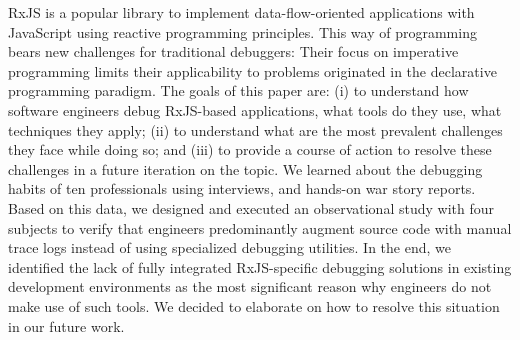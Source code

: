 RxJS is a popular library to implement data-flow-oriented applications with JavaScript using reactive programming principles. This way of programming bears new challenges for traditional debuggers: Their focus on imperative programming limits their applicability to problems originated in the declarative programming paradigm. The goals of this paper are: (i) to understand how software engineers debug RxJS-based applications, what tools do they use, what techniques they apply; (ii) to understand what are the most prevalent challenges they face while doing so; and (iii) to provide a course of action to resolve these challenges in a future iteration on the topic. We learned about the debugging habits of ten professionals using interviews, and hands-on war story reports. Based on this data, we designed and executed an observational study with four subjects to verify that engineers predominantly augment source code with manual trace logs instead of using specialized debugging utilities. In the end, we identified the lack of fully integrated RxJS-specific debugging solutions in existing development environments as the most significant reason why engineers do not make use of such tools. We decided to elaborate on how to resolve this situation in our future work.